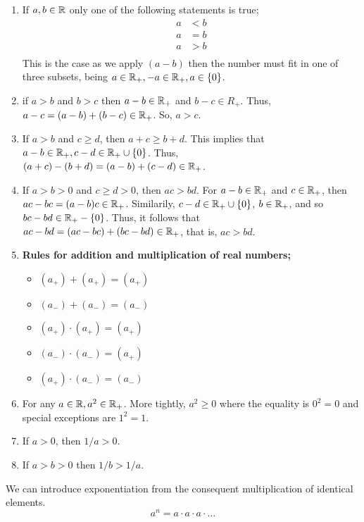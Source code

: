 \begin{enumerate}
    \item If $a,b \in \mathbb{R}$ only one of the following statements is true;
    \begin{align*}
        a &< b \\
        a &= b \\
        a &> b \\
    \end{align*}
    This is the case as we apply $(a-b)$ then the number must fit in one of three subsets, being $a\in \mathbb{R}_+, -a \in \mathbb{R}_+, a\in \{0\}$.
    \item if $a >b$ and $b>c$ then $a-b \in \mathbb{R}_+$ and $b - c\in R_+$. Thus, $a - c = (a-b) + (b-c) \in \mathbb{R}_+$. So, $a > c$.
    \item If $a > b$ and $c \geq d$, then $ a + c \geq b + d$. This implies that $a - b \in \mathbb{R}_+, c - d \in \mathbb{R}_+ \cup \{0\}$. Thus, $(a+c) - (b+d) = (a-b) + (c-d) \in \mathbb{R}_+$.
    \item If $a > b > 0$ and $c \geq d > 0$, then $ac > bd$. For $a-b \in \mathbb{R}_+$ and $c \in \mathbb{R}_+$, then $ac - bc = (a-b)c \in \mathbb{R}_+$. Similarily, $c-d \in \mathbb{R}_+ \cup \{0\}$, $b\in\mathbb{R}_+$, and so $bc - bd \in \mathbb{R}_+ - \{0\}$. Thus, it follows that $ac - bd = (ac - bc) + (bc- bd) \in \mathbb{R}_+$, that is, $ac > bd$.
    \item \textbf{Rules for addition and multiplication of real numbers;} 
    \begin{itemize}
        \item $(a_+) + (a_+) = (a_+)$
        \item $(a_-) + (a_-) = (a_-)$
        \item $(a_+) \cdot (a_+) = (a_+)$
        \item $(a_-) \cdot (a_-) = (a_+)$
        \item $(a_+) \cdot (a_-) = (a_-)$
    \end{itemize}
    \item For any $a \in \mathbb{R}, a^2 \in \mathbb{R}_+$. More tightly, $a^2 \geq 0$ where the equality is $0^2 = 0$ and special exceptions are $1^2 = 1$.
    \item If $a>0$, then $1/a >0$. 
    \item If $a > b >0$ then $1/b > 1/a$.
\end{enumerate}

We can introduce exponentiation from the consequent multiplication of identical elements. \[a^n = a \cdot a \cdot a \cdot \dots\]
